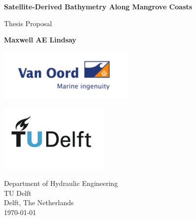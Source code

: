 \begin{titlepage}

  \begin{center}
    \vspace*{1cm}
    \color{white}
    \Huge
    \textbf{Satellite-Derived Bathymetry Along Mangrove Coasts}
    
    \vspace{0.5cm}
    Thesis Proposal
    
    \vspace{1.5cm}
    \Large
    \textbf{Maxwell AE Lindsay}
    
    \large
    \vfill
    
    
    \vspace{0.8cm}
    
    \includegraphics[width=0.5\textwidth]{figures/VanOord-2048x785.png}
    
    \includegraphics[width=0.4\textwidth]{figures/TU_P1_full-color.png}
    
    Department of Hydraulic Engineering\\
    TU Delft\\
    Delft, The Netherlands\\
    \today
    
  \end{center}
\end{titlepage}